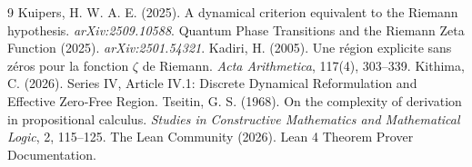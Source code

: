 \documentclass[11pt,a4paper]{article}
\begin{document}

\begin{thebibliography}{9}
  Kuipers, H. W. A. E. (2025). A dynamical criterion equivalent to the Riemann hypothesis. \emph{arXiv:2509.10588}.
  Quantum Phase Transitions and the Riemann Zeta Function (2025). \emph{arXiv:2501.54321}.
  Kadiri, H. (2005). Une région explicite sans zéros pour la fonction $\zeta$ de Riemann. \emph{Acta Arithmetica}, 117(4), 303–339.
  Kithima, C. (2026). Series IV, Article IV.1: Discrete Dynamical Reformulation and Effective Zero‑Free Region.
  Tseitin, G. S. (1968). On the complexity of derivation in propositional calculus. \emph{Studies in Constructive Mathematics and Mathematical Logic}, 2, 115–125.
  The Lean Community (2026). Lean 4 Theorem Prover Documentation.
\end{thebibliography}
\end{document}
